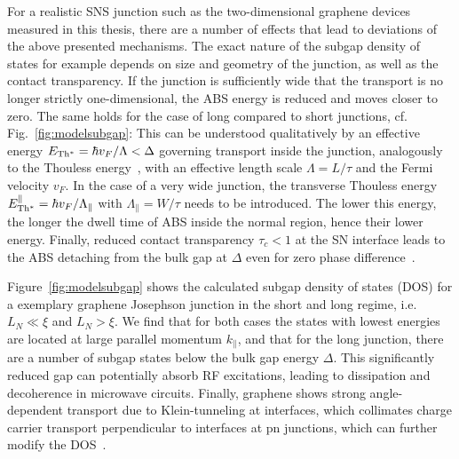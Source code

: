 For a realistic SNS junction such as the two-dimensional graphene devices measured in this thesis, there are a number of effects that lead to deviations of the above presented mechanisms.
%
The exact nature of the subgap density of states for example depends on size and geometry of the junction, as well as the contact transparency.
%
If the junction is sufficiently wide that the transport is no longer strictly one-dimensional, the ABS energy is reduced and moves closer to zero.
%
The same holds for the case of long compared to short junctions, cf. Fig.~\ref{fig:modelsubgap}:
%
This can be understood qualitatively by an effective energy $E_{\rm Th^*}=\hbar v_F/\Lambda<\Delta$ governing transport inside the junction, analogously to the Thouless energy~\cite{benshalomQuantumOscillationsCritical2015,schmidtBallisticGrapheneSuperconducting2018}, with an effective length scale $\Lambda=L/\tau$ and the Fermi velocity $v_F$.
%
In the case of a very wide junction, the transverse Thouless energy $E_{\rm Th^*}^\parallel=\hbar v_F/\Lambda_\parallel$ with $\Lambda_\parallel=W/\tau$ needs to be introduced.
%
The lower this energy, the longer the dwell time of ABS inside the normal region, hence their lower energy.
%
Finally, reduced contact transparency $\tau_c<1$ at the SN interface leads to the ABS detaching from the bulk gap at $\Delta$ even for zero phase difference~\cite{bretheauTunnellingSpectroscopyAndreev2017a}.


Figure~\ref{fig:modelsubgap} shows the calculated subgap density of states (DOS) for a exemplary graphene Josephson junction in the short and long regime, i.e. $L_N\ll\xi$ and $L_N>\xi$.
%
We find that for both cases the states with lowest energies are located at large parallel momentum $k_\parallel$, and that for the long junction, there are a number of subgap states below the bulk gap energy $\Delta$.
%
This significantly reduced gap can potentially absorb RF excitations, leading to dissipation and decoherence in microwave circuits.
%
Finally, graphene shows strong angle-dependent transport due to Klein-tunneling at interfaces, which collimates charge carrier transport perpendicular to interfaces at pn junctions, which can further modify the DOS~\cite{beenakkerColloquiumAndreevReflection2008}.

